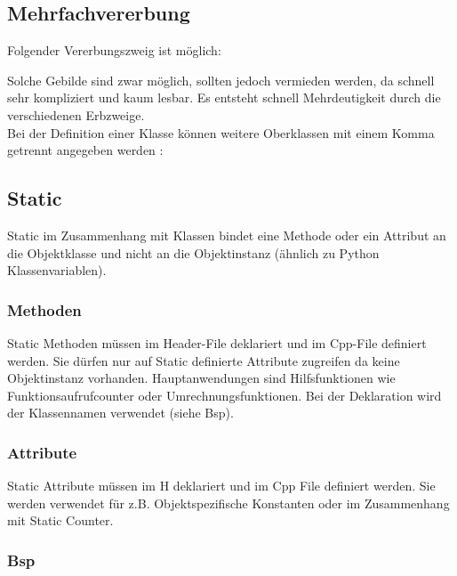 \subsection{Mehrfachvererbung}

Folgender Vererbungszweig ist möglich:\\
\noindent
\begin{minipage}{0.5\columnwidth}
    \begin{center}
    \end{center}  
\end{minipage}
\begin{minipage}{0.5\columnwidth}
Solche Gebilde sind zwar möglich, sollten jedoch vermieden werden, da schnell sehr kompliziert und kaum lesbar. 
Es entsteht schnell Mehrdeutigkeit durch die verschiedenen Erbzweige.\\
Bei der Definition einer Klasse können weitere Oberklassen mit einem Komma getrennt angegeben werden :

\end{minipage}



\subsection{Static} 

Static im Zusammenhang mit Klassen bindet eine Methode oder ein Attribut an die Objektklasse und nicht an die Objektinstanz (ähnlich zu Python Klassenvariablen).


\subsubsection{Methoden}

Static Methoden müssen im Header-File deklariert und im Cpp-File definiert werden. 
Sie dürfen nur auf Static definierte Attribute zugreifen da keine Objektinstanz vorhanden. 
Hauptanwendungen sind Hilfsfunktionen wie Funktionsaufrufcounter oder Umrechnungsfunktionen. 
Bei der Deklaration wird der Klassennamen verwendet (siehe Bsp). 

\subsubsection{Attribute}

Static Attribute müssen im H deklariert und im Cpp File definiert werden. 
Sie werden verwendet für z.B. Objektspezifische Konstanten oder im Zusammenhang mit Static Counter. 

\subsubsection{Bsp}


